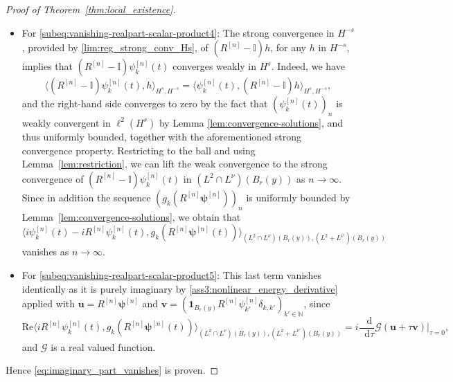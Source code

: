 \documentclass[12pt,a4paper]{amsart}
\numberwithin{equation}{section}
\newcommand{\ulu}{\boldsymbol{u}}
\newcommand{\ulv}{\boldsymbol{v}}
\newcommand{\ulpsi}{\boldsymbol{\psi}}
\newcommand*\diff{\mathop{}\!\mathrm{d}}
\begin{document}
\begin{proof}[Proof of Theorem~\ref{thm:local_existence}]
\begin{itemize}
			\item For \eqref{subeq:vanishing-realpart-scalar-product4}: The strong convergence in $ H^{-s} $, provided by \eqref{lim:reg_strong_conv_Hs}, of $ (R^{[n]}-\mathbb{I}) h$, for any $h$ in $H^{-s} $, implies that $ (R^{[n]}-\mathbb{I}) \psi^{[n]}_{k}(t) $ converges weakly in $H^{s} $. Indeed, we have
			\begin{equation}
				\langle (R^{[n]}-\mathbb{I}) \psi^{[n]}_{k}(t) , h \rangle_{H^{s} , H^{-s}} = \langle  \psi^{[n]}_{k}(t) , (R^{[n]}-\mathbb{I}) h \rangle_{H^{s} , H^{-s}},
			\end{equation} 
			and the right-hand side converges to zero by the fact that $ (\psi^{[n]}_{k}(t))_n $ is weakly convergent in $\ell^2(H^s)$ by Lemma \ref{lem:convergence-solutions}, and thus uniformly bounded, together with the aforementioned strong convergence property. Restricting to the ball and using Lemma~\ref{lem:restriction}, we can lift the weak convergence to the strong convergence of $ (R^{[n]}-\mathbb{I}) \psi^{[n]}_{k}(t) $ in $ (L^2\cap L^{\nu})(B_r(y)) $ as $n\to \infty$. Since in addition the sequence $ (g_{k} (R^{[n]} \ulpsi^{[n]}))_n $ is uniformly bounded by Lemma~\ref{lem:convergence-solutions}, we obtain that
			\begin{equation}
				\langle i \psi^{[n]}_{k}(t) -i R^{[n]} \psi^{[n]}_{k}(t) , g_{k}(R^{[n]}\ulpsi^{[n]}(t)) \rangle_{(L^2\cap L^{\nu})(B_r(y)),(L^2+L^{\nu'})(B_r(y))}
			\end{equation}
			vanishes as $ n \rightarrow \infty $.
			\item For \eqref{subeq:vanishing-realpart-scalar-product5}: This last term vanishes identically as it is purely imaginary by \ref{ass3:nonlinear_energy_derivative} applied with $\ulu = R^{[n]}\ulpsi^{[n]}$ and $\ulv = (\boldsymbol{1}_{B_r(y)}R^{[n]}\psi^{[n]}_{k'}\delta_{k,k'})_{k'\in\mathbb{N}}$, since
			\begin{equation*}
				\mathrm{Re}\langle i R^{[n]} \psi^{[n]}_k(t), g_{k}(R^{[n]}\ulpsi^{[n]}(t)) \rangle_{(L^2\cap L^{\nu})(B_r(y)) , (L^2+L^{\nu'})(B_r(y))} 
				= i \frac{\diff}{\diff \tau}\mathscr{G}(\ulu+\tau\ulv)\Big|_{\tau=0} ,
			\end{equation*}
			and $\mathscr{G}$ is a real valued function.
		\end{itemize}
		
		Hence \eqref{eq:imaginary_part_vanishes} is proven.
		

\end{proof}
\end{document}
